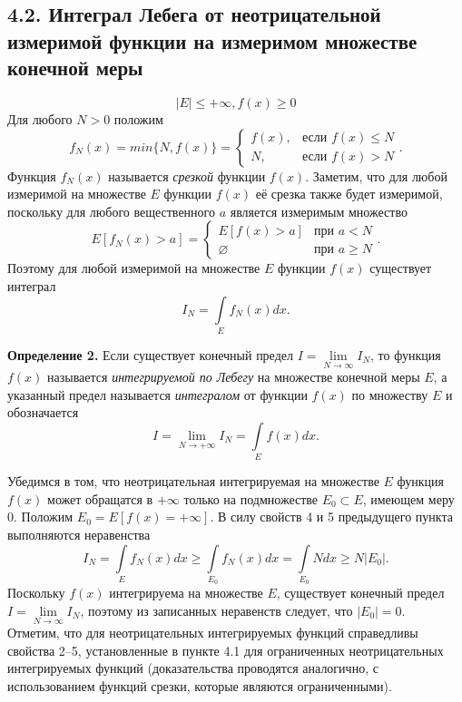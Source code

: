 \documentclass[12pt,a4paper, titlepage]{article}
\begin{document}
\subsection*{4.2. Интеграл Лебега от неотрицательной измеримой функции на измеримом множестве конечной меры}
$$
|E| \leqslant + \infty, f(x) \geqslant 0
$$
Для любого $N > 0$ положим
$$
f_N(x) = min \lbrace N, f(x) \rbrace = \begin{cases}
f(x), &\text{если $f(x) \leqslant N$}\\
N, &\text{если $f(x) > N$}
\end{cases}.
$$
Функция $f_N(x)$ называется \textit{срезкой} функции $f(x)$. Заметим, что для любой измеримой на множестве $E$ функции $f(x)$ её срезка также будет измеримой, поскольку для любого вещественного $a$ является измеримым множество
$$
E[f_N(x) > a] = \begin{cases}
E[f(x) > a] &\text{при $a < N$}\\
\varnothing &\text{при $a \geqslant N$}
\end{cases}.
$$
Поэтому для любой измеримой на множестве $E$ функции $f(x)$ существует интеграл
$$
I_N = \int\limits_E f_N(x) dx.
$$

\textbf{Определение 2.} Если существует конечный предел $I = \lim\limits_{N \to \infty} I_N$, то функция $f(x)$ называется \textit{интегрируемой по Лебегу} на множестве конечной меры $E$, а указанный предел называется \textit{интегралом} от функции $f(x)$ по множеству $E$ и обозначается 
$$
I = \lim_{N\to + \infty} I_N = \int\limits_E f(x) dx.
$$

Убедимся в том, что неотрицательная интегрируемая на множестве $E$ функция $f(x)$ может обращатся в $+ \infty$ только на подмножестве $E_0 \subset E$, имеющем меру 0. Положим $E_0 = E[f(x) = + \infty]$. В силу свойств 4 и 5 предыдущего пункта выполняются неравенства
$$
I_N = \int\limits_E f_N(x) dx \geqslant \int\limits_{E_0} f_N(x) dx = \int\limits_{E_0} N dx \geqslant N |E_0|.
$$
Поскольку $f(x)$ интегрируема на множестве $E$, существует конечный предел $I = \lim\limits_{N \to \infty} I_N$, поэтому из записанных неравенств следует, что $|E_0| = 0$.\\

Отметим, что для неотрицательных интегрируемых функций справедливы свойства 2--5, установленные в пункте 4.1 для ограниченных неотрицательных интегрируемых функций (доказательства проводятся аналогично, с использованием функций срезки, которые являются ограниченными). \\
\end{document}
